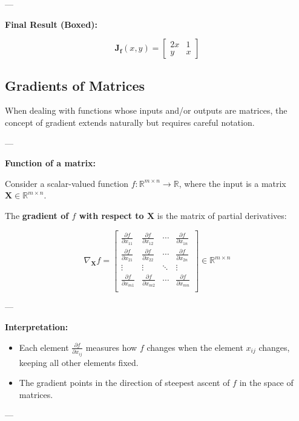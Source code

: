 ---

\textbf{Final Result (Boxed):}

\[
\boxed{
\mathbf{J}_{\mathbf{f}}(x, y) =
\begin{bmatrix}
2x & 1 \\
y & x
\end{bmatrix}
}
\]

\subsection{Gradients of Matrices}

When dealing with functions whose inputs and/or outputs are matrices, the concept of gradient extends naturally but requires careful notation.

---

\textbf{Function of a matrix:}

Consider a scalar-valued function \( f: \mathbb{R}^{m \times n} \to \mathbb{R} \), where the input is a matrix \( \mathbf{X} \in \mathbb{R}^{m \times n} \).

The \textbf{gradient of \( f \) with respect to \( \mathbf{X} \)} is the matrix of partial derivatives:

\[
\nabla_{\mathbf{X}} f =
\begin{bmatrix}
\frac{\partial f}{\partial x_{11}} & \frac{\partial f}{\partial x_{12}} & \cdots & \frac{\partial f}{\partial x_{1n}} \\
\frac{\partial f}{\partial x_{21}} & \frac{\partial f}{\partial x_{22}} & \cdots & \frac{\partial f}{\partial x_{2n}} \\
\vdots & \vdots & \ddots & \vdots \\
\frac{\partial f}{\partial x_{m1}} & \frac{\partial f}{\partial x_{m2}} & \cdots & \frac{\partial f}{\partial x_{mn}} \\
\end{bmatrix}
\in \mathbb{R}^{m \times n}
\]

---

\textbf{Interpretation:}
\begin{itemize}
    \item Each element \(\frac{\partial f}{\partial x_{ij}}\) measures how \(f\) changes when the element \( x_{ij} \) changes, keeping all other elements fixed.
    \item The gradient points in the direction of steepest ascent of \( f \) in the space of matrices.
\end{itemize}

---


